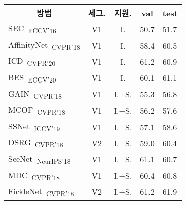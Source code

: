 \begin{table}[]
\normalsize
\centering
{\small
\begin{tabular}{@{}lccll@{}}
\toprule
\multicolumn{1}{c}{방법}                                                              & 세그.      & 지원.  & \multicolumn{1}{c}{val} & \multicolumn{1}{c}{test} \\ \midrule
\multicolumn{1}{l}{SEC~\cite{kolesnikov2016seed}\textsubscript{ECCV'16}}                & V1        & I.    & 50.7                    & 51.7                     \\
\multicolumn{1}{l}{AffinityNet~\cite{ahn2018learning}\textsubscript{CVPR'18}}           & V1        & I.    & 58.4                    & 60.5                     \\
\multicolumn{1}{l}{ICD~\cite{fan2020learning}\textsubscript{CVPR'20}}                   & V1        & I.    & 61.2                    & 60.9                     \\
\multicolumn{1}{l}{BES~\cite{chen2020boundary}\textsubscript{ECCV'20}}                  & V1        & I.    & 60.1                    & 61.1                     \\
\multicolumn{1}{l}{GAIN~\cite{li2018tell}\textsubscript{CVPR'18}}                       & V1        & I.+S. & 55.3                    & 56.8                     \\
\multicolumn{1}{l}{MCOF~\cite{wang2018weakly}\textsubscript{CVPR'18}}                   & V1        & I.+S. & 56.2                    & 57.6                     \\
\multicolumn{1}{l}{SSNet~\cite{zeng2019joint}\textsubscript{ICCV'19}}                   & V1        & I.+S. & 57.1                    & 58.6                     \\
\multicolumn{1}{l}{DSRG~\cite{huang2018weakly}\textsubscript{CVPR'18}}                  & V2        & I.+S. & 59.0                    & 60.4                     \\
\multicolumn{1}{l}{SeeNet~\cite{hou2018self}\textsubscript{NeurIPS'18}}                 & V1        & I.+S. & 61.1                    & 60.7                     \\
\multicolumn{1}{l}{MDC~\cite{wei2018revisiting}\textsubscript{CVPR'18}}                 & V1        & I.+S. & 60.4                    & 60.8                     \\
\multicolumn{1}{l}{FickleNet~\cite{lee2019ficklenet}\textsubscript{CVPR'18}}            & V2        & I.+S. & 61.2                    & 61.9                     \\

\end{tabular}}
\end{table}
